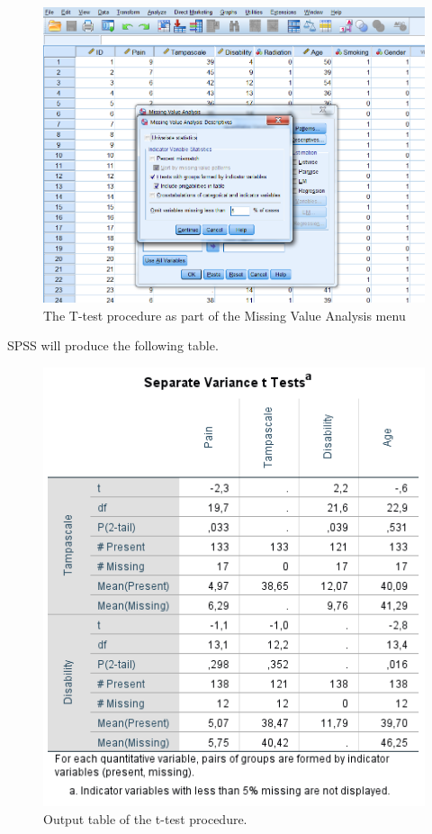 \documentclass[
]{book}
\begin{document}
\begin{figure}

{\centering \includegraphics[width=0.9\linewidth]{images/fig2.11} 

}

\caption{The T-test procedure as part of the Missing Value Analysis menu}\label{fig:fig2-11}
\end{figure}

SPSS will produce the following table.

\begin{figure}

{\centering \includegraphics[width=0.7\linewidth]{images/tab2.5} 

}

\caption{Output table of the t-test procedure.}\label{fig:tab2-5}
\end{figure}
\end{document}
